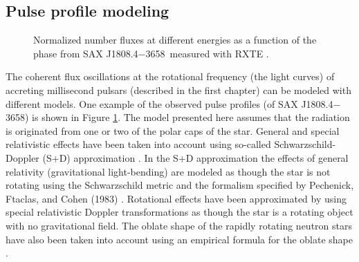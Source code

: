 \documentclass{wihuri}
\def\source{SAX J1808.4$-$3658}
\begin{document}
\subsection{Pulse profile modeling}


\begin{figure}
\centerline{} 
\caption{Normalized number fluxes at different energies as a function of the phase from \source \ measured with RXTE . 
\label{fig:saxdata}}
\end{figure}


The coherent flux oscillations at the rotational frequency (the light curves) of accreting millisecond pulsars (described in the first chapter) can be modeled with different models. One example of the observed pulse profiles (of \source) is shown in Figure \ref{fig:saxdata}. The model presented here assumes that the radiation is originated from one or two of the polar caps of the star. General and special relativistic effects have been taken into account using so-called Schwarzschild-Doppler (S+D) approximation %
\cite{millerlamb98}%
\cite{poutagierlinskisax}. In the S+D approximation the effects of general relativity (gravitational light-bending) are modeled as though the star is not rotating using the Schwarzschild metric and the formalism specified by
Pechenick, Ftaclas, and Cohen (1983) \cite{pechenick}. Rotational effects have been approximated by using special relativistic Doppler transformations as though the star is a rotating object with no gravitational field. The oblate shape of the rapidly rotating neutron stars have also been taken into account using an empirical formula for the oblate shape \cite{algendy} \cite{morsink}.

\end{document}
